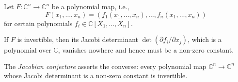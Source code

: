 \documentclass[12pt]{article}
\begin{document}
Let $F \colon \mathbb{C}^n \to \mathbb{C}^n$ be a polynomial map, i.e.,
$$F(x_1,\dots,x_n) = (f_1(x_1,\dots,x_n), \dots,f_n(x_1,\dots,x_n))$$
for certain polynomials $f_i \in \mathbb{C}[X_1,\dots,X_n]$.

If $F$ is invertible, then its Jacobi determinant $\det(\partial f_i/\partial
x_j)$, which is a polynomial over $\mathbb{C}$,
vanishes nowhere and hence must be a non-zero constant.

The \emph{Jacobian conjecture} asserts the converse: every polynomial map
$\mathbb{C}^n \to \mathbb{C}^n$ whose Jacobi determinant is a non-zero constant
is invertible.
\end{document}
